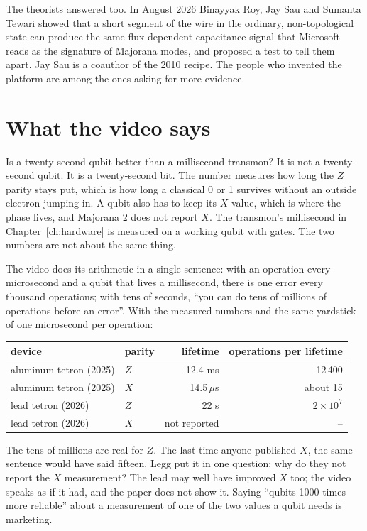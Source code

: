 The theorists answered too. In August 2026 Binayyak Roy, Jay Sau and Sumanta Tewari showed
that a short segment of the wire in the ordinary, non-topological state can produce the same
flux-dependent capacitance signal that Microsoft reads as the signature of Majorana modes, and
proposed a test to tell them apart. Jay Sau is a coauthor of the 2010 recipe. The people who
invented the platform are among the ones asking for more evidence.

\section{What the video says}

\begin{question}{Is a twenty-second qubit better than a millisecond transmon?}
It is not a twenty-second qubit. It is a twenty-second bit. The number measures how long the
$Z$ parity stays put, which is how long a classical 0 or 1 survives without an outside
electron jumping in. A qubit also has to keep its $X$ value, which is where the phase lives,
and Majorana 2 does not report $X$. The transmon's millisecond in Chapter~\ref{ch:hardware} is
measured on a working qubit with gates. The two numbers are not about the same thing.
\end{question}

The video does its arithmetic in a single sentence: with an operation every microsecond and a
qubit that lives a millisecond, there is one error every thousand operations; with tens of
seconds, ``you can do tens of millions of operations before an error''. With the measured
numbers and the same yardstick of one microsecond per operation:

\begin{center}
\small
\renewcommand{\arraystretch}{1.2}
\begin{tabular}{llrr}
\hline
device & parity & lifetime & operations per lifetime \\
\hline
aluminum tetron (2025) & $Z$ & 12.4 ms & 12\,400 \\
aluminum tetron (2025) & $X$ & 14.5\,$\mu$s & about 15 \\
lead tetron (2026) & $Z$ & 22 s & $2 \times 10^7$ \\
lead tetron (2026) & $X$ & not reported & -- \\
\hline
\end{tabular}
\end{center}

The tens of millions are real for $Z$. The last time anyone published $X$, the same sentence
would have said fifteen. Legg put it in one question: why do they not report the $X$
measurement? The lead may well have improved $X$ too; the video speaks as if it had, and the
paper does not show it. Saying ``qubits 1000 times more reliable'' about a measurement of one
of the two values a qubit needs is marketing.

